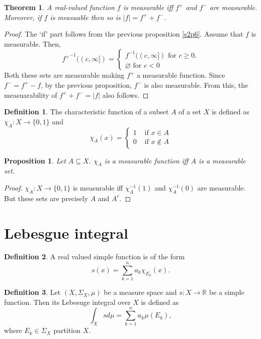 \documentclass{article}
\newcommand{\sor}{\mathbb{R}}
\theoremstyle{plain}
\newtheorem{thm}{Theorem}
\numberwithin{thm}{section}
\theoremstyle{plain}
\newtheorem{prop}{Proposition}
\numberwithin{prop}{section}
\theoremstyle{definition}
\newtheorem{defn}{Definition}
\numberwithin{defn}{section}
\theoremstyle{remark}
\theoremstyle{plain}
\numberwithin{cor}{section}
\numberwithin{equation}{section}
\begin{document}
\begin{thm}\label{s1t1}
A real-valued function $f$ is measurable iff $f^+$ and $f^-$ are measurable. 
Moreover, if $f$ is measuable then so is $|f| = f^+ + f^-$.
\end{thm}
\begin{proof}
The `if' part follows from the previous proposition \ref{s2p6}. Assume that
$f$ is measurable. Then,
\[
{f^+}^{-1}((c, \infty]) = \begin{cases}
f^{-1}((c, \infty]) \text{ for } c \ge 0. \\
\varnothing \text{ for } c < 0
\end{cases}
\]
Both these sets are measurable making $f^+$ a measurable function. Since $f^- =
f^+ - f$, by the previous proposition, $f^-$ is also measurable. From this, the
measuarability of $f^+ + f^- = |f|$ also follows.
\end{proof}

\begin{defn}\label{s2d3}
The characteristic function of a subset $A$ of a set $X$ is defined as
$\chi_A: X \rightarrow \{0, 1\}$ and
\[
\chi_A(x) = \begin{cases} 1 & \text{ if } x \in A \\
0 & \text{ if } x \notin A
\end{cases}
\]
\end{defn}

\begin{prop}\label{s2p7}
Let $A \subseteq X$. $\chi_A$ is a measurable function iff $A$ is a measurable
set.
\end{prop}
\begin{proof}
$\chi_A: X \rightarrow \{0, 1\}$ is measurable iff $\chi_A^{-1}(1)$ and 
$\chi_A^{-1}(0)$ are measurable. But these sets are precisely $A$ and $A^c$.
\end{proof}

\section{Lebesgue integral}\label{s3}
\begin{defn}\label{s3d1}
A real valued simple function is of the form
\[
s(x) = \sum_{k=1}^n a_k \chi_{E_k}(x).
\]
\end{defn}

\begin{defn}\label{s3d2}
Let $(X, \Sigma_X, \mu)$ be a measure space and $s: X \rightarrow \sor$ be
a simple function. Then its Lebesuge integral over $X$ is defined as
\[
\int_Xs d\mu = \sum_{k=1}^na_k\mu(E_k),
\]
where $E_k \in \Sigma_X$ partition $X$.
\end{defn}
\end{document}

